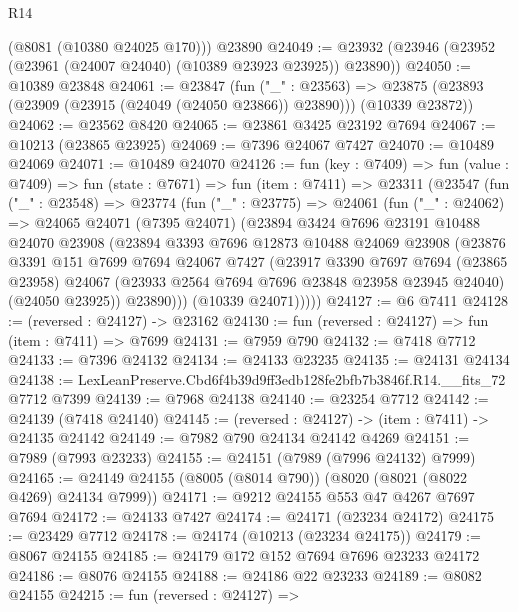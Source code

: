 \begin{lexlean}{R14}
\begin{coremodule}
      (@8081 (@10380 @24025 @170)))
    @23890
@24049 := @23932 (@23946 (@23952 (@23961 (@24007 @24040) (@10389 @23923 @23925)) @23890))
@24050 := @10389 @23848
@24061 := @23847
    (fun ("_" : @23563) =>
    @23875 (@23893 (@23909 (@23915 (@24049 (@24050 @23866)) @23890))) (@10339 @23872))
@24062 := @23562 @8420
@24065 := @23861 @3425 @23192 @7694
@24067 := @10213 (@23865 @23925)
@24069 := @7396 @24067 @7427
@24070 := @10489 @24069
@24071 := @10489 @24070
@24126 := fun (key : @7409) =>
  fun (value : @7409) =>
  fun (state : @7671) =>
  fun (item : @7411) =>
  @23311
    (@23547
      (fun ("_" : @23548) =>
      @23774
        (fun ("_" : @23775) =>
        @24061
          (fun ("_" : @24062) =>
          @24065
            @24071
            (@7395 @24071)
            (@23894
              @3424
              @7696
              @23191
              @10488
              @24070
              @23908
              (@23894
                @3393
                @7696
                @12873
                @10488
                @24069
                @23908
                (@23876
                  @3391
                  @151
                  @7699
                  @7694
                  @24067
                  @7427
                  (@23917
                    @3390
                    @7697
                    @7694
                    (@23865 @23958)
                    @24067
                    (@23933 @2564 @7694 @7696 @23848 @23958 @23945 @24040)
                    (@24050 @23925))
                  @23890)))
            (@10339 @24071)))))
@24127 := @6 @7411
@24128 := (reversed : @24127) -> @23162
@24130 := fun (reversed : @24127) => fun (item : @7411) => @7699
@24131 := @7959 @790
@24132 := @7418 @7712
@24133 := @7396 @24132
@24134 := @24133 @23235
@24135 := @24131 @24134
@24138 := LexLeanPreserve.Cbd6f4b39d9ff3edb128fe2bfb7b3846f.R14.__fits_72 @7712 @7399
@24139 := @7968 @24138
@24140 := @23254 @7712
@24142 := @24139 (@7418 @24140)
@24145 := (reversed : @24127) -> (item : @7411) -> @24135 @24142
@24149 := @7982 @790 @24134 @24142 @4269
@24151 := @7989 (@7993 @23233)
@24155 := @24151 (@7989 (@7996 @24132) @7999)
@24165 := @24149 @24155 (@8005 (@8014 @790)) (@8020 (@8021 (@8022 @4269) @24134 @7999))
@24171 := @9212 @24155 @553 @47 @4267 @7697 @7694
@24172 := @24133 @7427
@24174 := @24171 (@23234 @24172)
@24175 := @23429 @7712
@24178 := @24174 (@10213 (@23234 @24175))
@24179 := @8067 @24155
@24185 := @24179 @172 @152 @7694 @7696 @23233 @24172
@24186 := @8076 @24155
@24188 := @24186 @22 @23233
@24189 := @8082 @24155
@24215 := fun (reversed : @24127) =>

\end{coremodule}
\end{lexlean}

